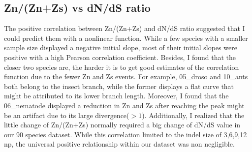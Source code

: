 \subsection{Zn/(Zn+Zs) vs dN/dS ratio}
The positive correlation between Zn/(Zn+Zs) and dN/dS ratio suggested that I could predict them with a nonlinear function. While a few species with a smaller sample size displayed a negative initial slope, most of their initial slopes were positive with a high Pearson correlation coefficient. Besides, I found that the closer two species are, the harder it is to get good estimates of the correlation function due to the fewer Zn and Zs events. For example, 05\_droso and 10\_ants both belong to the insect branch, while the former displays a flat curve that might be attributed to its lower branch length. Moreover, I found that the 06\_nematode displayed a reduction in Zn and Zs after reaching the peak might be an artifact due to its large divergence($>1$). Additionally, I realized that the little change of Zn/(Zn+Zs) normally required a big change of dN/dS value in our 90 species dataset. While this correlation limited to the indel size of 3,6,9,12 np, the universal positive relationship within our dataset was non negligible. 